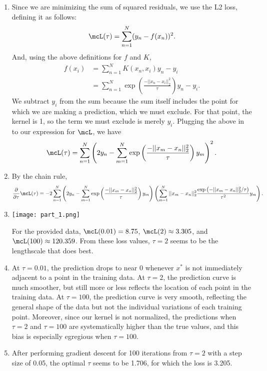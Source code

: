 \documentclass[submit]{harvardml}
\begin{document}
\begin{enumerate}
    \item Since we are minimizing the sum of squared residuals, we use the L2 loss, defining it as follows:
    \begin{equation*}
        \mcL(\tau) = \sum_{n=1}^N (y_n - f(x_n))^2.
    \end{equation*}
    And, using the above definitions for $f$ and $K$,
    \begin{align*}
        f(x_i) &= \sum_{n=1}^N K(x_n, x_i) y_n - y_i \\
        &= \sum_{n=1}^N \exp \left( \frac{-||x_n - x_i||_2^2}{\tau} \right) y_n - y_i.
    \end{align*}
    We subtract $y_i$ from the sum because the sum itself includes the point for which we are making a prediction, which we must exclude.  For that point, the kernel is 1, so the term we must exclude is merely $y_i$.
    Plugging the above in to our expression for $\mcL$, we have
    \begin{equation*}
        \mcL(\tau) = \sum_{n=1}^N \left( 2y_n - \sum_{m=1}^N \exp \left( \frac{-||x_m - x_n||_2^2}{\tau} \right) y_m \right)^2.
    \end{equation*}
    
    \item By the chain rule,
    \begin{equation*}
        \frac{\partial}{\partial \tau}\mcL(\tau) = -2 \sum_{n=1}^N \left( 2y_n - \sum_{m=1}^N \exp \left( \frac{-||x_m - x_n||_2^2}{\tau} \right) y_m \right) \left( \sum_{m=1}^N || x_m - x_n ||_2^2 \frac{\exp \left( -||x_m - x_n||_2^2 / \tau \right)}{\tau^2} y_m \right).
    \end{equation*}

    \item \texttt{[image: part\_1.png]}
    
    For the provided data, $\mcL(0.01) = 8.75$, $\mcL(2) \approx 3.305$, and $\mcL(100) \approx 120.359$.  From these loss values, $\tau = 2$ seems to be the lengthscale that does best.
    
    \item At $\tau = 0.01$, the prediction drops to near $0$ whenever $x^*$ is not immediately adjacent to a point in the training data.  At $\tau = 2$, the prediction curve is much smoother, but still more or less reflects the location of each point in the training data.  At $\tau = 100$, the prediction curve is very smooth, reflecting the general shape of the data but not the individual variations of each training point.  Moreover, since our kernel is not normalized, the predictions when $\tau = 2$ and $\tau = 100$ are systematically higher than the true values, and this bias is especially egregious when $\tau = 100$.
    
    \item After performing gradient descent for 100 iterations from $\tau = 2$ with a step size of 0.05, the optimal $\tau$ seems to be 1.706, for which the loss is 3.205.
\end{enumerate}
\end{document}
